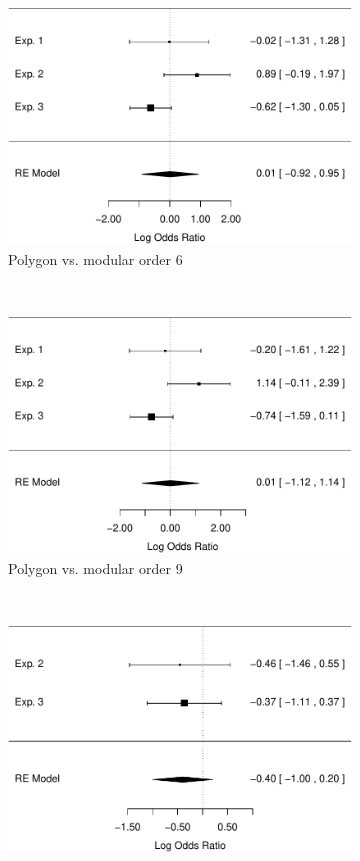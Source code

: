 \documentclass[man,mask,10pt]{apa6}
\begin{document}
\begin{figure}[t]
\centering
\begin{subfigure}[c]{0.4\textwidth}
\centering
\includegraphics[width=\textwidth]{figures/meta/conditionpolygon.pdf}
\caption{Polygon vs. modular order 6}
\end{subfigure}
~
\begin{subfigure}[c]{0.4\textwidth}
\centering
\includegraphics[width=\textwidth]{figures/meta/question_typeoperation_9_conditionpolygon.pdf}
\caption{Polygon vs. modular order 9}
\end{subfigure} \\
\centering
\begin{subfigure}[c]{0.4\textwidth}
\centering
\includegraphics[width=\textwidth]{figures/meta/conditionhybrid.pdf}

\end{subfigure}
\end{figure}
\end{document}
